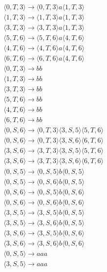 \documentclass[a4paper,12pt]{article}
\begin{document}
\begin{align*}
&\langle 0, T, 3 \rangle \rightarrow \langle 0, T, 3 \rangle a \langle 1, T, 3 \rangle \\
&\langle 1, T, 3 \rangle \rightarrow \langle 1, T, 3 \rangle a \langle 1, T, 3 \rangle \\
&\langle 3, T, 3 \rangle \rightarrow \langle 3, T, 3 \rangle a \langle 1, T, 3 \rangle \\
&\langle 5, T, 6 \rangle \rightarrow \langle 5, T, 6 \rangle a \langle 4, T, 6 \rangle \\
&\langle 4, T, 6 \rangle \rightarrow \langle 4, T, 6 \rangle a \langle 4, T, 6 \rangle \\
&\langle 6, T, 6 \rangle \rightarrow \langle 6, T, 6 \rangle a \langle 4, T, 6 \rangle \\
&\langle 0, T, 3 \rangle \rightarrow bb \\
&\langle 1, T, 3 \rangle \rightarrow bb \\
&\langle 3, T, 3 \rangle \rightarrow bb \\
&\langle 5, T, 6 \rangle \rightarrow bb \\
&\langle 4, T, 6 \rangle \rightarrow bb \\
&\langle 6, T, 6 \rangle \rightarrow bb \\
&\langle 0, S, 6 \rangle \rightarrow \langle 0, T, 3 \rangle \langle 3, S, 5 \rangle \langle 5, T, 6 \rangle \\
&\langle 0, S, 6 \rangle \rightarrow \langle 0, T, 3 \rangle \langle 3, S, 6 \rangle \langle 6, T, 6 \rangle \\
&\langle 3, S, 6 \rangle \rightarrow \langle 3, T, 3 \rangle \langle 3, S, 5 \rangle \langle 5, T, 6 \rangle \\
&\langle 3, S, 6 \rangle \rightarrow \langle 3, T, 3 \rangle \langle 3, S, 6 \rangle \langle 6, T, 6 \rangle \\
&\langle 0, S, 5 \rangle \rightarrow \langle 0, S, 5 \rangle b \langle 0, S, 5 \rangle \\
&\langle 0, S, 5 \rangle \rightarrow \langle 0, S, 6 \rangle b \langle 0, S, 5 \rangle \\
&\langle 0, S, 6 \rangle \rightarrow \langle 0, S, 5 \rangle b \langle 0, S, 6 \rangle \\
&\langle 0, S, 6 \rangle \rightarrow \langle 0, S, 6 \rangle b \langle 0, S, 6 \rangle \\
&\langle 3, S, 5 \rangle \rightarrow \langle 3, S, 5 \rangle b \langle 0, S, 5 \rangle \\
&\langle 3, S, 5 \rangle \rightarrow \langle 3, S, 6 \rangle b \langle 0, S, 5 \rangle \\
&\langle 3, S, 6 \rangle \rightarrow \langle 3, S, 5 \rangle b \langle 0, S, 6 \rangle \\
&\langle 3, S, 6 \rangle \rightarrow \langle 3, S, 6 \rangle b \langle 0, S, 6 \rangle \\
&\langle 0, S, 5 \rangle \rightarrow aaa \\
&\langle 3, S, 5 \rangle \rightarrow aaa
\end{align*}
\end{document}
